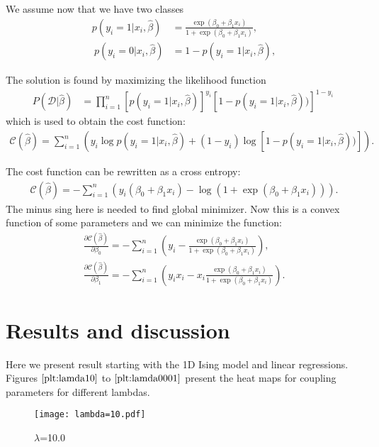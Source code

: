 \documentclass[10pt]{article}
\begin{document}
We assume now that we have two classes
 \begin{align} p(y_i=1|x_i,\hat{\beta}) &= \frac{\exp{(\beta_0+\beta_1x_i)}}{1+\exp{(\beta_0+\beta_1x_i)}}, \\\nonumber\ p(y_i=0|x_i,\hat{\beta}) &= 1 - p(y_i=1|x_i,\hat{\beta}), \end{align}

The solution is found by maximizing the likelihood function 
\begin{align} P(\mathcal{D}|\hat{\beta})& = \prod_{i=1}^n \left[p(y_i=1|x_i,\hat{\beta})\right]^{y_i}\left[1-p(y_i=1|x_i,\hat{\beta}))\right]^{1-y_i}\nonumber \ \end{align}
which is used to obtain the  cost function:
\begin{align}
\mathcal{C}(\hat{\beta}) = \sum_{i=1}^n \left( y_i\log{p(y_i=1|x_i,\hat{\beta})} + (1-y_i)\log\left[1-p(y_i=1|x_i,\hat{\beta}))\right]\right).
\end{align}

The cost function can be rewritten as a cross entropy:
\begin{align}
\mathcal{C}(\hat{\beta})=-\sum_{i=1}^n  \left(y_i(\beta_0+\beta_1x_i) -\log{(1+\exp{(\beta_0+\beta_1x_i)})}\right).
\end{align}
The minus sing here is needed to find global minimizer. Now this is a convex function of some parameters and we can minimize the function:
\begin{align}
\frac{\partial \mathcal{C}(\hat{\beta})}{\partial \beta_0} = -\sum_{i=1}^n  \left(y_i -\frac{\exp{(\beta_0+\beta_1x_i)}}{1+\exp{(\beta_0+\beta_1x_i)}}\right),\\
\frac{\partial \mathcal{C}(\hat{\beta})}{\partial \beta_1} = -\sum_{i=1}^n  \left(y_ix_i -x_i\frac{\exp{(\beta_0+\beta_1x_i)}}{1+\exp{(\beta_0+\beta_1x_i)}}\right).
\end{align}

\section{Results and discussion}
Here we present result starting with the 1D Ising model and linear regressions.
Figures $\ref{plt:lamda10}$ to $\ref{plt:lamda0001}$ present the heat maps for coupling parameters for different lambdas. 



\begin{figure}
	\centerline{\texttt{[image: lambda=10.pdf]}}
	\caption{$\lambda$=10.0}
	\label{plt:lamda10}
\end{figure}
\end{document}
